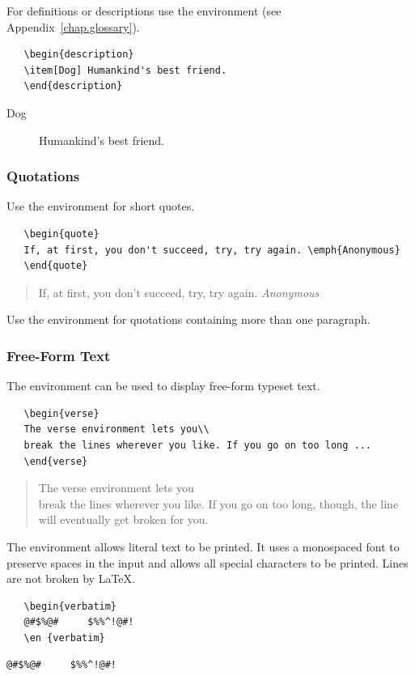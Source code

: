 For definitions or descriptions use the  environment (see Appendix~\ref{chap.glossary}).
\begin{verbatim}
   \begin{description}
   \item[Dog] Humankind's best friend.
   \end{description}
\end{verbatim}
\begin{description}
\item[Dog] Humankind's best friend.
\end{description}
\subsubsection{Quotations}
Use the  environment for short quotes.
\begin{verbatim}
   \begin{quote}
   If, at first, you don't succeed, try, try again. \emph{Anonymous}
   \end{quote}
\end{verbatim}
\begin{quote}
   If, at first, you don't succeed, try, try again. \emph{Anonymous}
\end{quote}
Use the  environment for quotations containing more than
 one paragraph.
\subsubsection{Free-Form Text}
The  environment can be used to display free-form typeset text.
\begin{verbatim}
   \begin{verse}
   The verse environment lets you\\
   break the lines wherever you like. If you go on too long ...
   \end{verse}
\end{verbatim}
\begin{verse}
The verse environment lets you\\
break the lines wherever you like. If you go on too long, though, the line will eventually get broken for you.
\end{verse}
The  environment allows literal text to be printed.
It uses a monospaced font to preserve spaces in the input and allows all special characters to be printed.
Lines are not broken by \LaTeX.
\begin{verbatim}
   \begin{verbatim}
   @#$%@#     $%%^!@#!
   \en {verbatim}
\end{verbatim}
\begin{verbatim}
@#$%@#     $%%^!@#!
\end{verbatim}

